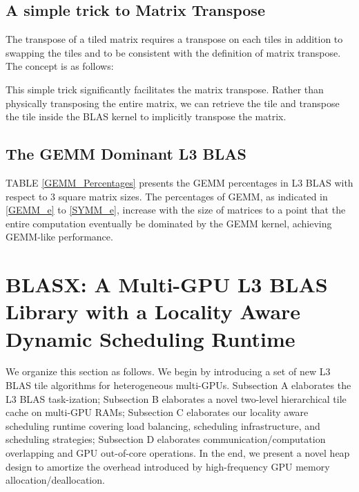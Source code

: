 \documentclass[conference]{IEEEtran}
\begin{document}
\vspace{-0.18in}

\vspace{-0.12in}
\subsection{A simple trick to Matrix Transpose}
\vspace{-0.05in}
The transpose of a tiled matrix requires a transpose on each tiles in addition to swapping the 
tiles  and  to be consistent with the definition of matrix transpose. 
The concept is as follows:\\
\vspace{-0.10in}

This simple trick significantly facilitates the matrix transpose. Rather than physically 
transposing the entire matrix, we can retrieve the tile  and transpose 
the tile inside the BLAS kernel to implicitly transpose the matrix.

\vspace{-0.12in}
\subsection{The GEMM Dominant L3 BLAS}
\vspace{-0.05in}
TABLE \ref{GEMM_Percentages} presents the GEMM percentages in L3 BLAS with respect to 3 square
matrix sizes. The percentages of GEMM, as indicated in \ref{GEMM_e} to \ref{SYMM_e}, increase
with the size of matrices to a point that the entire computation eventually be dominated by 
the GEMM kernel, achieving GEMM-like performance.

\section{BLASX: A Multi-GPU L3 BLAS Library with a Locality Aware Dynamic Scheduling Runtime}

We organize this section as follows. We begin by introducing a set of new L3 BLAS tile 
algorithms for heterogeneous multi-GPUs. Subsection A elaborates the L3 BLAS task-ization;
Subsection B elaborates a novel two-level hierarchical tile cache on multi-GPU RAMs; 
Subsection C elaborates our locality aware scheduling runtime covering load balancing,
scheduling infrastructure, and scheduling strategies; 
Subsection D elaborates communication/computation overlapping and GPU out-of-core operations. 
In the end, we present a novel heap design to amortize the overhead introduced by 
high-frequency GPU memory allocation/deallocation.
\end{document}
